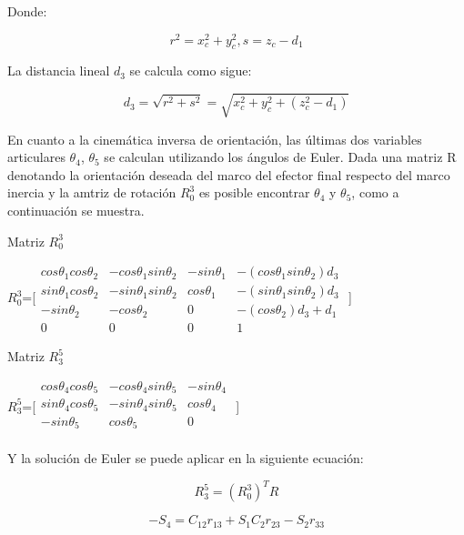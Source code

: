 \documentclass[letter,openright,12pt,spanish]{report}
\begin{document}
Donde:

\begin{displaymath}
r^2=x^2_c+y^2_c,s=z_c-d_1
\end{displaymath}

La distancia lineal $d_3$ se calcula como sigue:

\begin{displaymath}
d_3=\sqrt{r^2+s^2}=\sqrt{x^2_c+y^2_c+(z^2_c-d_1)}
\end{displaymath}

En cuanto a la cinem\'atica inversa de orientaci\'on, las \'ultimas dos variables articulares $\theta_4$, $\theta_5$ se calculan utilizando los \'angulos de Euler. Dada una matriz R denotando la orientaci\'on deseada del marco del efector final respecto del marco inercia y la amtriz de rotaci\'on $R^3_0$ es posible encontrar $\theta_4$ y $\theta_5$, como a continuaci\'on se muestra.

 Matriz $R^3_0$

\begin{center}
$R^3_0$=[$\begin{matrix}
	cos\theta_1cos\theta_2 & -cos\theta_1sin\theta_2 & -sin\theta_1 & -(cos\theta_1sin\theta_2)d_3\\
	sin\theta_1cos\theta_2 & -sin\theta_1sin\theta_2 & cos\theta_1 & -(sin\theta_1sin\theta_2)d_3\\
	-sin\theta_2 & -cos\theta_2 & 0 & -(cos\theta_2)d_3+d_1\\
	0 & 0 & 0 & 1
\end{matrix}$ ]
\end{center}

Matriz $R^5_3$

\begin{center}
$R^5_3$=[$\begin{matrix}
	cos\theta_4cos\theta_5 & -cos\theta_4sin\theta_5 & -sin\theta_4\\
	sin\theta_4cos\theta_5 & -sin\theta_4sin\theta_5 & cos\theta_4\\
	-sin\theta_5 & cos\theta_5 & 0 \\
\end{matrix}$ ]
\end{center}

Y la soluci\'on de Euler se puede aplicar en la siguiente ecuaci\'on:

\begin{displaymath}
R^5_3=(R^3_0)^TR
\end{displaymath}

\begin{displaymath}
-S_4=C_12r_13+S_1C_2r_23-S_2r_33
\end{displaymath}
\end{document}
